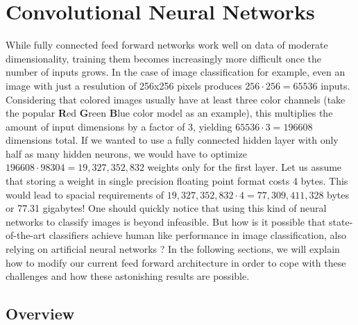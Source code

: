 \chapter{Convolutional Neural Networks}

While fully connected feed forward networks work well on data of
moderate dimensionality, training them becomes increasingly more
difficult once the number of inputs grows. In the case of image
classification for example, even an image with just a resulution of
256x256 pixels produces \(256 \cdot 256 = 65536\) inputs. Considering
that colored images usually have at least three color channels (take
the popular \textbf{R}ed \textbf{G}reen \textbf{B}lue color model as
an example), this multiplies the amount of input dimensions by a
factor of 3, yielding \(65536 \cdot 3 = 196608\) dimensions total. If
we wanted to use a fully connected hidden layer with only half as many
hidden neurons, we would have to optimize \(196608 \cdot 98304 =
19,327,352,832\) weights only for the first layer. Let us assume that
storing a weight in single precision floating point format
costs 4 bytes. This
would lead to spacial requirements of \(19,327,352,832 \cdot 4 =
77,309,411,328\) bytes or 77.31 gigabytes! One should quickly notice
that using this kind of neural networks to classify images is beyond
infeasible. But how is it possible that state-of-the-art classifiers
achieve human like performance in image classification, also
relying on artificial neural networks \cite{Russakovsky}? In the
following sections, we will explain how to modify our current feed
forward architecture in order to cope with these challenges and how
these astonishing results are possible.

\section{Overview}
\label{sec:conv-overview}

